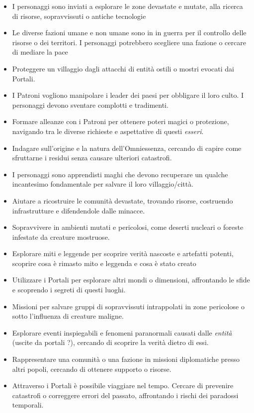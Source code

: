 \begin{multicols}{2}
\begin{itemize}[leftmargin=*] \setlength{\itemsep}{0pt}
\item I personaggi sono inviati a esplorare le zone devastate e mutate, alla ricerca di risorse, sopravvissuti o antiche tecnologie
\item Le diverse fazioni umane e non umane sono in in guerra per il controllo delle risorse o dei territori. I personaggi potrebbero scegliere una fazione o cercare di mediare la pace
\item Proteggere un villaggio dagli attacchi di entità ostili o mostri evocati dai Portali.
\item I Patroni vogliono manipolare i leader dei paesi per obbligare il loro culto. I personaggi devono sventare complotti e tradimenti.
\item Formare alleanze con i Patroni per ottenere poteri magici o protezione, navigando tra le diverse richieste e aspettative di questi \emph{esseri}.
\item Indagare sull'origine e la natura dell'Omniessenza, cercando di capire come sfruttarne i residui senza causare ulteriori catastrofi.
\item I personaggi sono apprendisti maghi che devono recuperare un qualche incantesimo fondamentale per salvare il loro villaggio/città.
\item Aiutare a ricostruire le comunità devastate, trovando risorse, costruendo infrastrutture e difendendole dalle minacce.
\item Sopravvivere in ambienti mutati e pericolosi, come deserti nucleari o foreste infestate da creature mostruose.
\item Esplorare miti e leggende per scoprire verità nascoste e artefatti potenti, scoprire cosa è rimasto mito e leggenda e cosa è stato creato
\item Utilizzare i Portali per esplorare altri mondi o dimensioni, affrontando le sfide e scoprendo i segreti di questi luoghi.
\item Missioni per salvare gruppi di sopravvissuti intrappolati in zone pericolose o sotto l'influenza di creature maligne.
\item Esplorare eventi inspiegabili e fenomeni paranormali causati dalle \emph{entità} (uscite da portali ?), cercando di scoprire la verità dietro di essi.
\item Rappresentare una comunità o una fazione in missioni diplomatiche presso altri popoli, cercando di ottenere supporto o risorse.
\item Attraverso i Portali è possibile viaggiare nel tempo. Cercare di prevenire catastrofi o correggere errori del passato, affrontando i rischi dei paradossi temporali.

\end{itemize}
\end{multicols}
